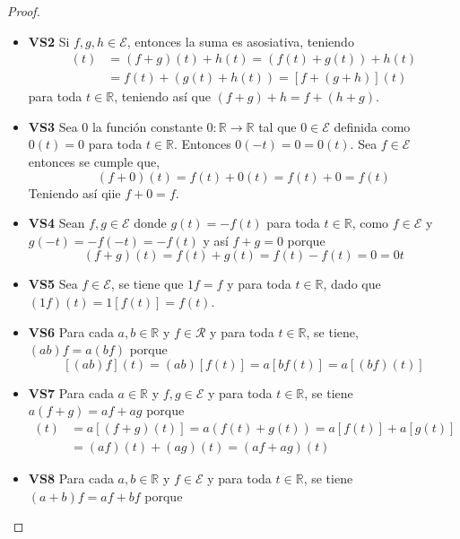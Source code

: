 \documentclass[11pt,letterpaper]{article}
\newcommand{\R}{\mathbb{R}}
\begin{document}
\begin{enumerate}
\begin{proof}
\begin{itemize}
        \item \textbf{VS2} Si $f,g,h \in \mathscr{E}$, entonces la suma es asosiativa, teniendo
        \begin{align*}
            [(f+g)+h](t) 
                &= (f+g)(t) + h(t) = (f(t) + g(t)) + h(t)\\
                &= f(t) + (g(t) + h(t)) = [f + (g+h)](t)
        \end{align*}
        para toda $t \in \R$, teniendo así que $(f+g)+h=f+(h+g)$.
        
        \item \textbf{VS3} Sea $0$ la función constante $0: \R \to \R$ tal que $0 \in \mathscr{E}$
        definida como $0(t)=0$ para toda $t \in \R$. Entonces $0(-t)= 0 = 0(t)$.
        Sea $f \in \mathscr{E}$ entonces se cumple que,
        \[ (f+0)(t) = f(t) + 0(t) = f(t) + 0 = f(t) \]
        Teniendo así qiie $f + 0 = f$.

        \item \textbf{VS4} Sean $f, g \in \mathscr{E}$ donde $g(t)=-f(t)$ para toda $t \in \R$, como
        $f \in \mathscr{E}$ y $g(-t)=-f(-t)=-f(t)$ y así $f + g = 0$ porque
        \[ (f+g)(t) = f(t) + g(t) = f(t)-f(t) = 0 = 0t  \]

        \item \textbf{VS5} Sea $f \in \mathscr{E}$, se tiene que $1f = f$ y para toda $t \in \R$, dado que
        $(1f)(t)= 1[f(t)] = f(t)$.
        
        \item \textbf{VS6} Para cada $a,b \in \R$ y $f \in \mathscr{R}$ y para toda $t \in \R$, se tiene,
        $(ab)f=a(bf)$ porque
        \[ [(ab)f](t) = (ab)[f(t)] = a[bf(t)] = a[(bf)(t)] \]
        
        \item \textbf{VS7} Para cada $a \in \R$ y $f, g \in \mathscr{E}$ y para toda $t \in \R$,
        se tiene $a(f+g)=af+ag$ porque
        \begin{align*}
            [a (f+g)](t) 
                &= a [(f + g) (t)] = a (f (t) + g (t)) = a[f(t)] + a[g(t)]\\
                &= (af)(t) + (ag)(t) = (af + ag)(t)
        \end{align*}

        \item \textbf{VS8} Para cada $a,b \in \R$ y $f \in \mathscr{E}$ y para toda $t \in \R$,
        se tiene $(a+b)f=af+bf$ porque
        
    \end{itemize}
\end{proof}


\end{enumerate}
\end{document}
